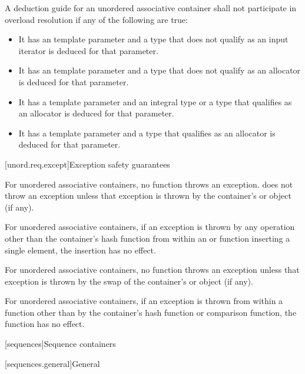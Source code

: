 \pnum
A deduction guide for an unordered associative container shall not participate in overload resolution
if any of the following are true:
\begin{itemize}
\item It has an  template parameter
and a type that does not qualify as an input iterator is deduced for that parameter.

\item It has an  template parameter
and a type that does not qualify as an allocator is deduced for that parameter.

\item It has a  template parameter
and an integral type or a type that qualifies as an allocator is deduced for that parameter.

\item It has a  template parameter
and a type that qualifies as an allocator is deduced for that parameter.
\end{itemize}

[unord.req.except]{Exception safety guarantees}

\pnum
{}%
%
For unordered associative containers, no  function
throws an exception.  does not throw an
exception unless that exception is thrown by the container's  or
 object (if any).

\pnum
For unordered associative containers, if an exception is thrown by any
operation other than the container's hash function from within an
 or  function inserting a single element,
the insertion has no effect.

\pnum
For unordered associative containers, no  function throws
an exception unless that exception is thrown by the swap of the container's
 or  object (if any).

\pnum
{}%
%
For unordered associative containers, if an exception is thrown
from within a  function other than by the container's hash
function or comparison function, the  function has no effect.

[sequences]{Sequence containers}

[sequences.general]{General}

